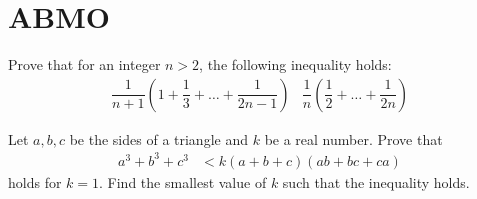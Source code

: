 \documentclass{subfile}
\begin{document}
	\section{ABMO}\label{sec:abmo}
		\begin{problem}
			Prove that for an integer $n>2$, the following inequality holds:
				\begin{align*}
					\dfrac{1}{n+1}\left(1+\dfrac{1}{3}+\ldots+\dfrac{1}{2n-1}\right)
						& \dfrac{1}{n}\left(\dfrac{1}{2}+\ldots+\dfrac{1}{2n}\right)
				\end{align*}
		\end{problem}
	
		\begin{problem}
			Let $a,b,c$ be the sides of a triangle and $k$ be a real number. Prove that
				\begin{align*}
					a^{3}+b^{3}+c^{3}
						& < k(a+b+c)(ab+bc+ca)
				\end{align*}
			holds for $k=1$. Find the smallest value of $k$ such that the inequality holds.
		\end{problem}
\end{document}
